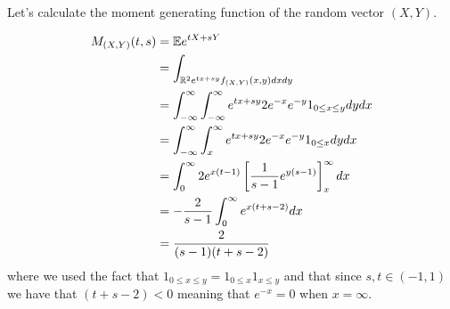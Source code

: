 
Let's calculate the moment generating function of the random vector $ (X,Y)$.

\begin{align*}
    M_{(X,Y)} (t,s) &= \mathbb{E} e^{tX + sY} \\
		    &= \int_{\mathbb{R}^2 e^{tx + sy} f_{(X,Y)} (x,y) dx dy }\\
		    &= \int_{-\infty}^{\infty} \int_{-\infty}^{\infty} e^{tx + sy} 2 e^{-x} e^{-y}
		    1_{0 \leq x \leq y} dy dx\\
		    &= \int_{-\infty}^{\infty} \int_{x}^{\infty} e^{tx + sy} 2e^{-x} e^{-y}  1_{0
		    \leq x} dy dx\\
		    &= \int_{0}^{\infty} 2 e^{x(t-1)}  \left[ \frac{1}{s-1} e^{y(s-1)}
		    \right]_{x}^{\infty} dx\\
		    &= -\frac{2}{s-1} \int_{0}^{\infty} e^{x (t+s-2)} dx\\
		    &= \frac{2}{(s-1)(t+s-2)} 
\end{align*}
where we used the fact that $ 1_{0 \leq x \leq y} = 1_{0 \leq x} 1_{x\leq y} $ and that since $ s,t
\in (-1,1)$ we have that $ (t+s-2) < 0$ meaning that $ e^{-x} = 0 $ when $ x = \infty$.
